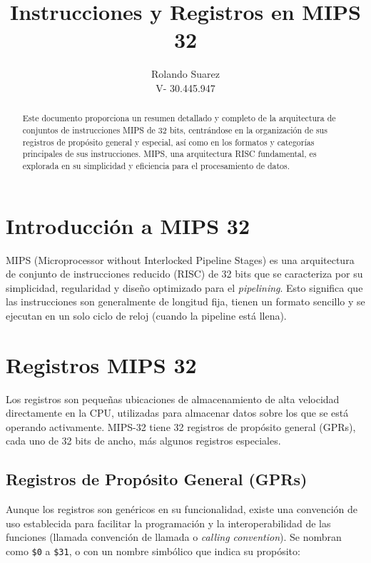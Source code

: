 \documentclass[letterpaper]{article}
\title{Instrucciones y Registros en MIPS 32}
\author{Rolando Suarez \\ 
		V- 30.445.947}
\date{}
\begin{document}
	
	\maketitle 
	
	\begin{abstract}
		Este documento proporciona un resumen detallado y completo de la arquitectura de conjuntos de instrucciones MIPS de 32 bits, centrándose en la organización de sus registros de propósito general y especial, así como en los formatos y categorías principales de sus instrucciones. MIPS, una arquitectura RISC fundamental, es explorada en su simplicidad y eficiencia para el procesamiento de datos.
	\end{abstract}
	
	\section{Introducción a MIPS 32}
	MIPS (Microprocessor without Interlocked Pipeline Stages) es una arquitectura de conjunto de instrucciones reducido (RISC) de 32 bits que se caracteriza por su simplicidad, regularidad y diseño optimizado para el \textit{pipelining}. Esto significa que las instrucciones son generalmente de longitud fija, tienen un formato sencillo y se ejecutan en un solo ciclo de reloj (cuando la pipeline está llena).
	
	\section{Registros MIPS 32}
	Los registros son pequeñas ubicaciones de almacenamiento de alta velocidad directamente en la CPU, utilizadas para almacenar datos sobre los que se está operando activamente. MIPS-32 tiene 32 registros de propósito general (GPRs), cada uno de 32 bits de ancho, más algunos registros especiales.
	
	\subsection{Registros de Propósito General (GPRs)}
	Aunque los registros son genéricos en su funcionalidad, existe una convención de uso establecida para facilitar la programación y la interoperabilidad de las funciones (llamada convención de llamada o \textit{calling convention}). Se nombran como \texttt{\$0} a \texttt{\$31}, o con un nombre simbólico que indica su propósito:
	
\end{document}

